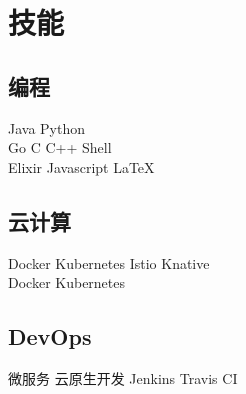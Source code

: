 \documentclass[]{deedy-resume-openfont}
\begin{document}
\begin{minipage}[t]{0.25\textwidth}

\section{技能}
\sectionsep
\subsection{编程}
Java \textbullet{} Python  \\
Go \textbullet{} C \textbullet{} C++ \textbullet{} Shell \\
Elixir \textbullet{} Javascript \textbullet{} \LaTeX\ \\ 
\sectionsep

\subsection{云计算}
Docker \textbullet{} Kubernetes \textbullet{} Istio \textbullet{} Knative \\
Docker \textbullet{} Kubernetes  \\
\sectionsep

\subsection{DevOps}
微服务 \textbullet{} 云原生开发 \textbullet{} Jenkins \textbullet{} Travis CI

%
%

\end{minipage} 
\hfill
\end{document}
